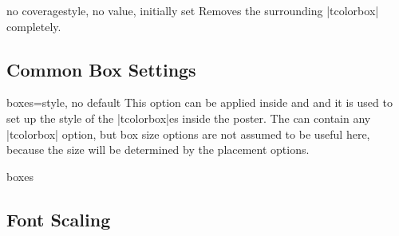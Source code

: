 \begin{postersetTcbKey}[][doc new=2017-07-03]{no coverage}{}{style, no value, initially set}
  Removes the surrounding |tcolorbox| completely.
\end{postersetTcbKey}

\clearpage
\subsection{Common Box Settings}\label{subsec:poster_boxsettings}


\begin{postersetTcbKey}[][doc new=2017-07-03]{boxes}{=}{style, no default}
  This option can be applied inside  and 
  and it is used to set up the style of the |tcolorbox|es inside the poster.
  The  can contain any |tcolorbox| option, but box size
  options are not assumed to be useful here, because the size will be
  determined by the placement options.

\begin{exdispExample}{boxes}
\begin{tcbposter}[
  poster   = {spacing=2mm,columns=3,rows=2},
  coverage = {height=5cm,
              interior style={top color=yellow,bottom color=yellow!50!red},
             },
  boxes    = {sharp corners=downhill,arc=3mm,boxrule=1mm,
              colback=white,colframe=cyan,
              title style={left color=black,right color=cyan},
              fonttitle=\bfseries}
]
\end{tcbposter}
\end{exdispExample}

\end{postersetTcbKey}


\subsection{Font Scaling}\label{subsec:poster_fontsize}

